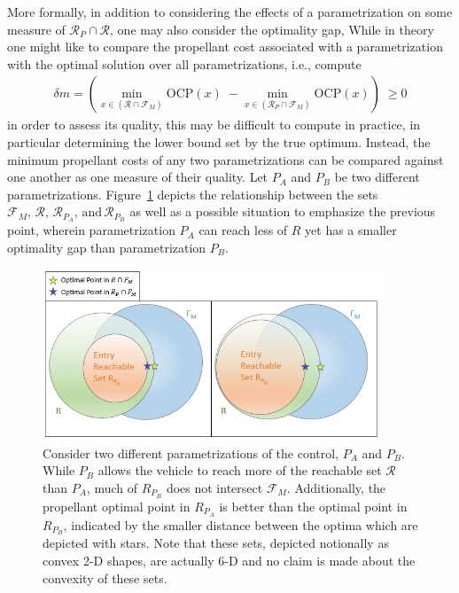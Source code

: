 \documentclass[letterpaper, preprint, paper,11pt]{AAS}
\begin{document}
More formally, in addition to considering the effects of a parametrization on some measure of $\mathcal{R}_P\cap \mathcal{R}$, one may also consider the optimality gap, 
While in theory one might like to compare the propellant cost associated with a parametrization with the optimal solution over all parametrizations, i.e., compute
\begin{align}
\delta m = \left( \min_{x\in (\mathcal{R}\cap \mathcal{F}_M)} \mathrm{OCP}(x)\; - \min_{x\in (\mathcal{R}_P\cap \mathcal{F}_M)} \mathrm{OCP}(x) \right) \; \ge 0
\end{align}
in order to assess its quality, this may be difficult to compute in practice, in particular determining the lower bound set by the true optimum. Instead, the minimum propellant costs of any two parametrizations can be compared against one another as one measure of their quality. Let $ P_A $ and  $ P_B $ be two different parametrizations.
Figure~\ref{fig_sets} depicts the relationship between the sets $\mathcal{F}_M,\,\mathcal{R},\,\mathcal{R}_{P_A},\,\mathrm{and}\,\mathcal{R}_{P_B}$ as well as a possible situation to emphasize the previous point, wherein parametrization $ P_A $ can reach less of $R$ yet has a smaller optimality gap than parametrization $ P_B $. 
\begin{figure}[h!]
	\centering
	\includegraphics[width=0.9\textwidth]{SetDefinitions} 
	\caption{Consider two different parametrizations of the control, $ P_A $ and $ P_B $. While $ P_B $ allows the vehicle to reach more of the reachable set $\mathcal{ R} $ than  $P_A$, much of $ R_{P_B}$ does not intersect $\mathcal{F}_M$. Additionally, the propellant optimal point in $ R_{P_A}$ is better than the optimal point in $ R_{P_B}$, indicated by the smaller distance between the optima which are depicted with stars.  Note that these sets, depicted notionally as convex 2-D shapes, are actually 6-D and no claim is made about the convexity of these sets.}
	\label{fig_sets}
\end{figure}
\end{document}
